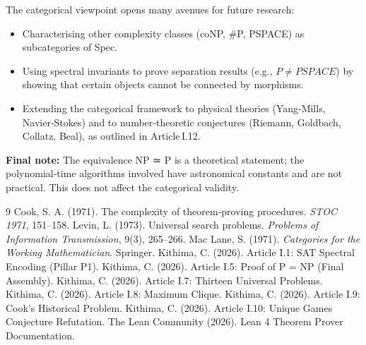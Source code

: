 \documentclass[11pt,a4paper]{article}
\begin{document}
The categorical viewpoint opens many avenues for future research:
\begin{itemize}
\item Characterising other complexity classes (coNP, \#P, PSPACE) as subcategories of Spec.
\item Using spectral invariants to prove separation results (e.g., $P \neq PSPACE$) by showing that certain objects cannot be connected by morphisms.
\item Extending the categorical framework to physical theories (Yang‑Mills, Navier‑Stokes) and to number‑theoretic conjectures (Riemann, Goldbach, Collatz, Beal), as outlined in Article I.12.
\end{itemize}

\vspace{0.5cm}
\noindent\textbf{Final note:} The equivalence NP ≃ P is a theoretical statement; the polynomial‑time algorithms involved have astronomical constants and are not practical. This does not affect the categorical validity.


\begin{thebibliography}{9}
  Cook, S. A. (1971). The complexity of theorem‑proving procedures. \emph{STOC 1971}, 151–158.
  Levin, L. (1973). Universal search problems. \emph{Problems of Information Transmission}, 9(3), 265–266.
  Mac Lane, S. (1971). \emph{Categories for the Working Mathematician}. Springer.
  Kithima, C. (2026). Article I.1: SAT Spectral Encoding (Pillar P1).
  Kithima, C. (2026). Article I.5: Proof of P = NP (Final Assembly).
  Kithima, C. (2026). Article I.7: Thirteen Universal Problems.
  Kithima, C. (2026). Article I.8: Maximum Clique.
  Kithima, C. (2026). Article I.9: Cook's Historical Problem.
  Kithima, C. (2026). Article I.10: Unique Games Conjecture Refutation.
  The Lean Community (2026). Lean 4 Theorem Prover Documentation.
\end{thebibliography}
\end{document}
